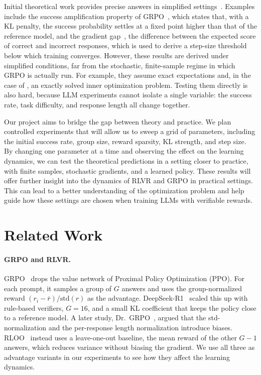 \documentclass{article}
\theoremstyle{definition}
\newcommand{\1}{\mathbf{1}}
\begin{document}
Initial theoretical work provides precise answers in simplified
settings~\citep{mroueh2025rlvr,suk2025gradientgap,thrampoulidis2026passk,bay2026grpostd}.
Examples include the success amplification property of
GRPO~\citep{mroueh2025rlvr}, which states that, with a KL penalty, the
success probability settles at a fixed point higher than that of the
reference model, and the gradient gap~\citep{suk2025gradientgap}, the
difference between the expected score of correct and incorrect responses,
which is used to derive a step-size threshold below which training
converges. However, these results are derived under simplified conditions,
far from the stochastic, finite-sample regime in which GRPO is actually run.
For example, they assume exact expectations and, in the case of
\citet{mroueh2025rlvr}, an exactly solved inner optimization problem.
Testing them directly is also hard, because LLM experiments cannot isolate a
single variable: the success rate, task difficulty, and response length all
change together.

Our project aims to bridge the gap between theory and practice. We plan
controlled experiments that will allow us to sweep a grid of parameters,
including the initial success rate, group size, reward sparsity, KL
strength, and step size. By changing one parameter at a time and observing
the effect on the learning dynamics, we can test the theoretical predictions
in a setting closer to practice, with finite samples, stochastic gradients,
and a learned policy. These results will offer further insight into the
dynamics of RLVR and GRPO in practical settings. This can lead to a better
understanding of the optimization problem and help guide how these settings
are chosen when training LLMs with verifiable rewards.

\section{Related Work}
\label{sec:related}

\paragraph{GRPO and RLVR.}
GRPO~\citep{shao2024deepseekmath} drops the value network of Proximal Policy
Optimization (PPO). For each prompt, it samples a group of $G$ answers and uses the
group-normalized reward $(r_i - \bar r)/\mathrm{std}(r)$ as the advantage.
DeepSeek-R1~\citep{guo2025deepseekr1} scaled this up with rule-based verifiers,
$G=16$, and a small KL coefficient that keeps the policy close to a reference model.
A later study, Dr.~GRPO~\citep{liu2025drgrpo}, argued that the std-normalization and
the per-response length normalization introduce biases. RLOO~\citep{ahmadian2024rloo}
instead uses a leave-one-out baseline, the mean reward of the other $G-1$ answers,
which reduces variance without biasing the gradient. We use all three as advantage
variants in our experiments to see how they affect the learning dynamics.
\end{document}
